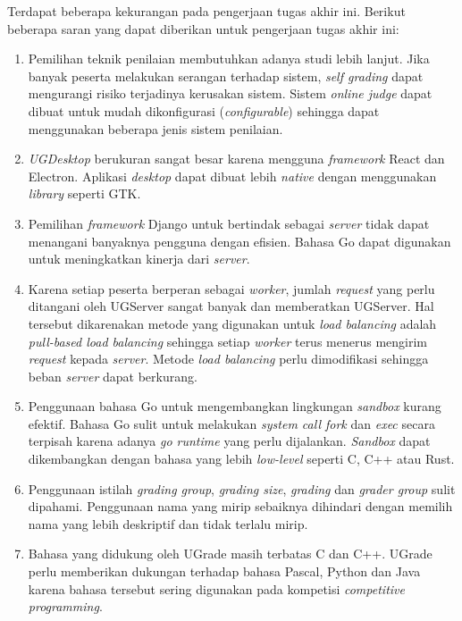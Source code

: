 \par Terdapat beberapa kekurangan pada pengerjaan tugas akhir ini. Berikut beberapa saran yang dapat diberikan untuk pengerjaan tugas akhir ini:
\begin{enumerate}
    \item Pemilihan teknik penilaian membutuhkan adanya studi lebih lanjut. Jika banyak peserta melakukan serangan terhadap sistem, \textit{self grading} dapat mengurangi risiko terjadinya kerusakan sistem. Sistem \textit{online judge} dapat dibuat untuk mudah dikonfigurasi (\textit{configurable}) sehingga dapat menggunakan beberapa jenis sistem penilaian.
    \item \textit{UGDesktop} berukuran sangat besar karena mengguna \textit{framework} React dan Electron. Aplikasi \textit{desktop} dapat dibuat lebih \textit{native} dengan menggunakan \textit{library} seperti GTK.
    \item Pemilihan \textit{framework} Django untuk bertindak sebagai \textit{server} tidak dapat menangani banyaknya pengguna dengan efisien. Bahasa Go dapat digunakan untuk meningkatkan kinerja dari \textit{server}.
    \item Karena setiap peserta berperan sebagai \textit{worker}, jumlah \textit{request} yang perlu ditangani oleh UGServer sangat banyak dan memberatkan UGServer. Hal tersebut dikarenakan metode yang digunakan untuk \textit{load balancing} adalah \textit{pull-based load balancing} sehingga setiap \textit{worker} terus menerus mengirim \textit{request} kepada \textit{server}. Metode \textit{load balancing} perlu dimodifikasi sehingga beban \textit{server} dapat berkurang.
    \item Penggunaan bahasa Go untuk mengembangkan lingkungan \textit{sandbox} kurang efektif. Bahasa Go sulit untuk melakukan \textit{system call fork} dan \textit{exec} secara terpisah karena adanya \textit{go runtime} yang perlu dijalankan. \textit{Sandbox} dapat dikembangkan dengan bahasa yang lebih \textit{low-level} seperti C, C++ atau Rust. 
    \item Penggunaan istilah \textit{grading group}, \textit{grading size}, \textit{grading} dan \textit{grader group} sulit dipahami. Penggunaan nama yang mirip sebaiknya dihindari dengan memilih nama yang lebih deskriptif dan tidak terlalu mirip. 
    \item Bahasa yang didukung oleh UGrade masih terbatas C dan C++. UGrade perlu memberikan dukungan terhadap bahasa Pascal, Python dan Java karena bahasa tersebut sering digunakan pada kompetisi \textit{competitive programming}.
\end{enumerate}
